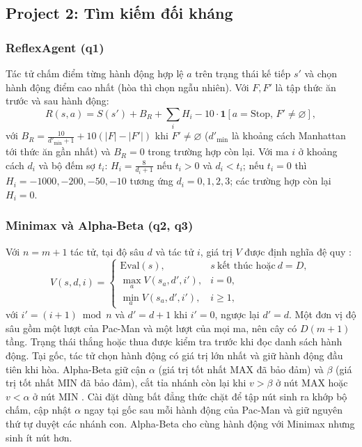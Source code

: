 \documentclass[conference]{IEEEtran}
\begin{document}
\subsection{Project 2: Tìm kiếm đối kháng}

\subsubsection{ReflexAgent (q1)}
Tác tử chấm điểm từng hành động hợp lệ $a$ trên trạng thái kế tiếp $s'$ và chọn hành động điểm cao nhất (hòa thì chọn ngẫu nhiên). Với $F,F'$ là tập thức ăn trước và sau hành động:
\begin{equation}
R(s,a)=S(s')+B_R+\sum_i H_i-10\cdot\mathbf{1}[a=\mathrm{Stop},\,F'\neq\varnothing],\label{eq:reflex}
\end{equation}
với $B_R=\frac{10}{d'_{\min}+1}+10(|F|-|F'|)$ khi $F'\neq\varnothing$ ($d'_{\min}$ là khoảng cách Manhattan tới thức ăn gần nhất) và $B_R=0$ trong trường hợp còn lại. Với ma $i$ ở khoảng cách $d_i$ và bộ đếm sợ $t_i$: $H_i=\frac{8}{d_i+1}$ nếu $t_i>0$ và $d_i<t_i$; nếu $t_i=0$ thì $H_i=-1000,-200,-50,-10$ tương ứng $d_i=0,1,2,3$; các trường hợp còn lại $H_i=0$.

\subsubsection{Minimax và Alpha-Beta (q2, q3)}
Với $n=m+1$ tác tử, tại độ sâu $d$ và tác tử $i$, giá trị $V$ được định nghĩa đệ quy \cite{b1,b3}:
\begin{equation}
V(s,d,i)=
\begin{cases}
\mathrm{Eval}(s), & s\ \text{kết thúc hoặc}\ d=D,\\
\max_a V(s_a,d',i'), & i=0,\\
\min_a V(s_a,d',i'), & i\ge 1,
\end{cases}\label{eq:minimax}
\end{equation}
với $i'=(i+1)\bmod n$ và $d'=d+1$ khi $i'=0$, ngược lại $d'=d$. Một đơn vị độ sâu gồm một lượt của Pac-Man và một lượt của mọi ma, nên cây có $D(m+1)$ tầng. Trạng thái thắng hoặc thua được kiểm tra trước khi đọc danh sách hành động. Tại gốc, tác tử chọn hành động có giá trị lớn nhất và giữ hành động đầu tiên khi hòa. Alpha-Beta giữ cận $\alpha$ (giá trị tốt nhất MAX đã bảo đảm) và $\beta$ (giá trị tốt nhất MIN đã bảo đảm), cắt tỉa nhánh còn lại khi $v>\beta$ ở nút MAX hoặc $v<\alpha$ ở nút MIN \cite{b4}. Cài đặt dùng bất đẳng thức chặt để tập nút sinh ra khớp bộ chấm, cập nhật $\alpha$ ngay tại gốc sau mỗi hành động của Pac-Man và giữ nguyên thứ tự duyệt các nhánh con. Alpha-Beta cho cùng hành động với Minimax nhưng sinh ít nút hơn.
\end{document}
